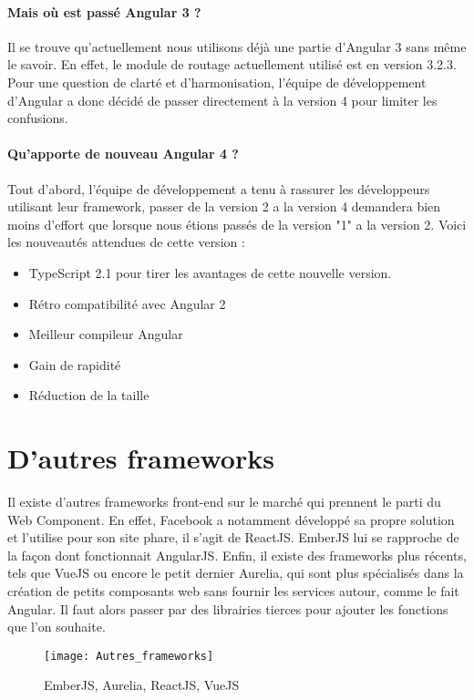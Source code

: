\paragraph{Mais où est passé Angular 3 ?}
Il se trouve qu'actuellement nous utilisons déjà une partie d'Angular 3 sans même le savoir. En effet, le module de routage actuellement utilisé est en version 3.2.3. Pour une question de clarté et d'harmonisation, l'équipe de développement d'Angular a donc décidé de passer directement à la version 4 pour limiter les confusions.

\paragraph{Qu'apporte de nouveau Angular 4 ?}
Tout d'abord, l'équipe de développement a tenu à rassurer les développeurs utilisant leur framework, passer de la version 2 a la version 4 demandera bien moins d'effort que lorsque nous étions passés de la version "1" a la version 2\cite{youtube:angular4annoncement}.
Voici les nouveautés attendues de cette version :
\begin{itemize}
	\item TypeScript 2.1 pour tirer les avantages de cette nouvelle version.
	\item Rétro compatibilité avec Angular 2
	\item Meilleur compileur Angular
	\item Gain de rapidité
	\item Réduction de la taille 
\end{itemize}

\section{D'autres frameworks}
Il existe d'autres frameworks front-end sur le marché qui prennent le parti du Web Component. En effet, Facebook a notamment développé sa propre solution et l'utilise pour son site phare, il s'agit de ReactJS. EmberJS lui se rapproche de la façon dont fonctionnait AngularJS. Enfin, il existe des frameworks plus récents, tels que VueJS ou encore le petit dernier Aurelia, qui sont plus spécialisés dans la création de petits composants web sans fournir les services autour, comme le fait Angular. Il faut alors passer par des librairies tierces pour ajouter les fonctions que l'on souhaite.
\begin{figure}[h]
	\centering
	\texttt{[image: Autres\_frameworks]}
	\caption{EmberJS, Aurelia, ReactJS, VueJS}
\end{figure}
